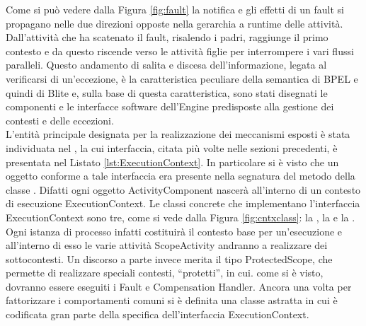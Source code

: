 Come si può vedere dalla Figura \ref{fig:fault} la notifica e gli effetti di un
fault si propagano nelle due direzioni opposte nella gerarchia a runtime delle
attività. Dall'attività che ha scatenato il fault, risalendo i padri, raggiunge
il primo contesto e da questo riscende verso le attività figlie per
interrompere i vari flussi paralleli. Questo andamento di salita e discesa dell'informazione,
legata al verificarsi di un'eccezione, \`e la caratteristica peculiare della
semantica di BPEL e quindi di Blite e, sulla base di questa caratteristica, sono
stati disegnati le componenti e le interfacce software dell'Engine predisposte
alla gestione dei contesti e delle eccezioni.
\\

L'entità principale designata per la realizzazione dei meccanismi esposti \`e
stata individuata nel , la cui interfaccia, citata più
volte nelle sezioni precedenti, è presentata nel Listato
\ref{lst:ExecutionContext}. In particolare si \`e visto che un oggetto conforme a
tale interfaccia era presente nella segnatura del metodo
 della classe .
Difatti ogni oggetto ActivityComponent nascerà all'interno di un contesto di
esecuzione ExecutionContext. Le classi concrete che implementano l'interfaccia
ExecutionContext sono tre, come si vede dalla Figura \ref{fig:cntxclass}: la
, la  e la .
Ogni istanza di processo infatti costituirà il contesto base per un'esecuzione e
all'interno di esso le varie attività ScopeActivity andranno a realizzare dei
sottocontesti. Un discorso a parte invece merita il tipo ProtectedScope, che
permette di realizzare speciali contesti, ``protetti'', in cui. come si è visto,
dovranno essere eseguiti i Fault e Compensation Handler. Ancora una volta per
fattorizzare i comportamenti comuni si \`e definita una classe astratta
 in cui è codificata gran parte della specifica
dell'interfaccia ExecutionContext.

